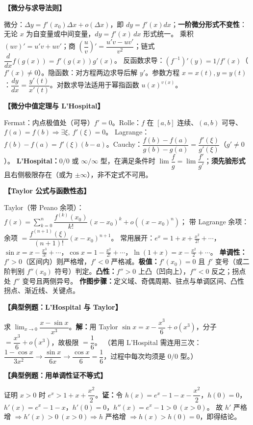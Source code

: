 \documentclass[12pt,a4paper,UTF8]{ctexart}
\newenvironment{kp}[1]{\par\smallskip\noindent\textbf{【#1】}\par\nobreak\smallskip}{\par\smallskip}
\begin{document}
\begin{kp}{微分与求导法则}
微分：$\Delta y=f'(x_0)\Delta x+o(\Delta x)$，即 $dy=f'(x)dx$；\textbf{一阶微分形式不变性}：无论 $x$ 为自变量或中间变量，$dy=f'(x)\,dx$ 形式统一。
乘积 $(uv)'=u'v+uv'$；商 $\left(\dfrac uv\right)'=\dfrac{u'v-uv'}{v^2}$；链式 $\dfrac{d}{dx}f(g(x))=f'(g(x))g'(x)$。
反函数求导：$(f^{-1})'(y)=1/f'(x)$（$f'(x)\ne0$）。隐函数：对方程两边求导后解 $y'$。参数方程 $x=x(t),y=y(t)$：$\dfrac{dy}{dx}=\dfrac{y'(t)}{x'(t)}$。对数求导法适用于幂指函数 $u(x)^{v(x)}$。
\end{kp}

\begin{kp}{微分中值定理与 L'Hospital}
Fermat：内点极值处（可导）$f'=0$。Rolle：$f$ 在 $[a,b]$ 连续、$(a,b)$ 可导、$f(a)=f(b)\Rightarrow\exists\xi,\ f'(\xi)=0$。
Lagrange：$f(b)-f(a)=f'(\xi)(b-a)$。Cauchy：$\dfrac{f(b)-f(a)}{g(b)-g(a)}=\dfrac{f'(\xi)}{g'(\xi)}$（$g'\ne0$）。
\textbf{L'Hospital：}$0/0$ 或 $\infty/\infty$ 型，在满足条件时 $\lim\dfrac f g=\lim\dfrac{f'}{g'}$；\textbf{须先验形式}且右侧极限存在（或为 $\pm\infty$），非不定式不可用。
\end{kp}

\begin{kp}{Taylor 公式与函数性态}
Taylor（带 Peano 余项）：$f(x)=\sum_{k=0}^n\dfrac{f^{(k)}(x_0)}{k!}(x-x_0)^k+o((x-x_0)^n)$；
带 Lagrange 余项：余项 $=\dfrac{f^{(n+1)}(\xi)}{(n+1)!}(x-x_0)^{n+1}$。
常用展开：$e^x=1+x+\frac{x^2}{2!}+\cdots$，$\sin x=x-\frac{x^3}{3!}+\cdots$，$\cos x=1-\frac{x^2}{2!}+\cdots$，$\ln(1+x)=x-\frac{x^2}{2}+\cdots$。
\textbf{单调性：}$f'>0$（区间内）则严格增，$f'<0$ 严格减。\textbf{极值：}$f'(x_0)=0$ 且 $f'$ 变号（或二阶判别 $f''(x_0)$ 符号）判定。\textbf{凸性：}$f''>0$ 上凸（凹向上），$f''<0$ 反之；拐点处 $f''$ 变号且两侧异号。
\textbf{作图步骤：}定义域、奇偶周期、驻点与单调区间、凸性拐点、渐近线、关键点。
\end{kp}

\begin{kp}{典型例题：L'Hospital 与 Taylor}
求 $\lim_{x\to0}\dfrac{x-\sin x}{x^3}$。\textbf{解：}用 Taylor $\sin x=x-\dfrac{x^3}{6}+o(x^3)$，分子 $=\dfrac{x^3}{6}+o(x^3)$，故极限 $=\dfrac16$。
（若用 L'Hospital 需连用三次：$\dfrac{1-\cos x}{3x^2}\to\dfrac{\sin x}{6x}\to\dfrac{\cos x}{6}=\dfrac16$，过程中每次均须是 $0/0$ 型。）
\end{kp}

\begin{kp}{典型例题：用单调性证不等式}
证明 $x>0$ 时 $e^x>1+x+\dfrac{x^2}{2}$。\textbf{证：}令 $h(x)=e^x-1-x-\dfrac{x^2}{2}$，$h(0)=0$，$h'(x)=e^x-1-x$，$h'(0)=0$，$h''(x)=e^x-1>0\ (x>0)$。
故 $h'$ 严格增 $\Rightarrow h'(x)>0\ (x>0)\Rightarrow h$ 严格增 $\Rightarrow h(x)>h(0)=0$，即得结论。
\end{kp}
\end{document}
